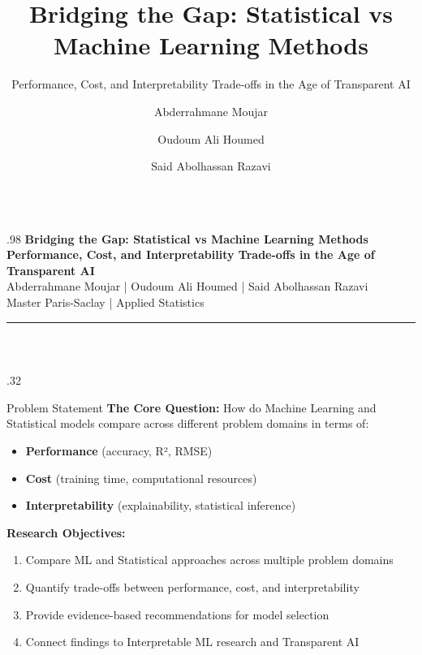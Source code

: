 \documentclass[final]{beamer}
\title{\textbf{Bridging the Gap: Statistical vs Machine Learning Methods}}
\subtitle{Performance, Cost, and Interpretability Trade-offs in the Age of Transparent AI}
\author{Abderrahmane Moujar \and Oudoum Ali Houmed \and Said Abolhassan Razavi}
\institute{Master Paris-Saclay | Applied Statistics}
\begin{document}
\begin{frame}[t]

\begin{columns}[t]
\begin{column}{.98\linewidth}
\vspace{1cm}
\centering
{\huge\textbf{Bridging the Gap: Statistical vs Machine Learning Methods}\\[0.5cm]
\Large\textbf{Performance, Cost, and Interpretability Trade-offs in the Age of Transparent AI}\\[1cm]}
{\large Abderrahmane Moujar \quad | \quad Oudoum Ali Houmed \quad | \quad Said Abolhassan Razavi\\[0.3cm]
Master Paris-Saclay | Applied Statistics}\\[0.5cm]
\rule{\linewidth}{2pt}\\[1cm]
\end{column}
\end{columns}

\vspace{1cm}

\begin{columns}[t]

\begin{column}{.32\linewidth}

\begin{block}{Problem Statement}
\textbf{The Core Question:}
How do Machine Learning and Statistical models compare across different problem domains in terms of:
\begin{itemize}
    \item \textcolor{mlcolor}{\textbf{Performance}} (accuracy, R², RMSE)
    \item \textcolor{statcolor}{\textbf{Cost}} (training time, computational resources)
    \item \textcolor{accentcolor}{\textbf{Interpretability}} (explainability, statistical inference)
\end{itemize}

\vspace{0.3cm}
\textbf{Research Objectives:}
\begin{enumerate}
    \item Compare ML and Statistical approaches across multiple problem domains
    \item Quantify trade-offs between performance, cost, and interpretability
    \item Provide evidence-based recommendations for model selection
    \item Connect findings to Interpretable ML research and Transparent AI
\end{enumerate}
\end{block}


\end{column}
\end{columns}
\end{frame}
\end{document}
